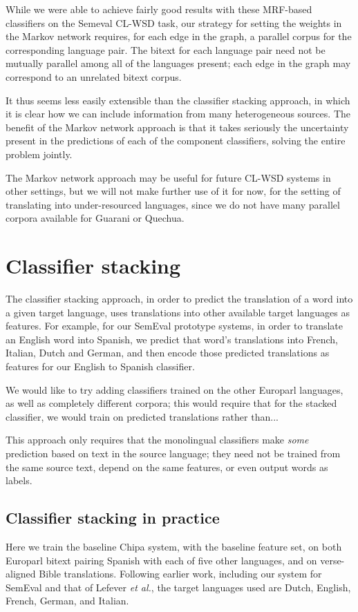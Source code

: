 While we were able to achieve fairly good results with these MRF-based
classifiers on the Semeval CL-WSD task, our strategy for setting the weights in
the Markov network requires, for each edge in the graph, a parallel corpus for
the corresponding language pair. The bitext for each language pair need not be
mutually parallel among all of the languages present; each edge in the graph
may correspond to an unrelated bitext corpus.

It thus seems less easily extensible than the classifier stacking approach, in
which it is clear how we can include information from many heterogeneous
sources. The benefit of the Markov network approach is that it takes seriously
the uncertainty present in the predictions of each of the component
classifiers, solving the entire problem jointly.

The Markov network approach may be useful for future CL-WSD systems in other
settings, but we will not make further use of it for now, for the setting of
translating into under-resourced languages, since we do not have many parallel
corpora available for Guarani or Quechua.

\section{Classifier stacking}
The classifier stacking approach, in order to predict the translation of a word
into a given target language, uses translations into other available target
languages as features.
For example, for our SemEval prototype systems, in order to translate an
English word into Spanish, we predict that word's translations into French,
Italian, Dutch and German, and then encode those predicted translations as
features for our English to Spanish classifier.


We would like to try adding classifiers trained on the other Europarl
languages, as well as completely different corpora; this would require that for
the stacked classifier, we would train on predicted translations rather than...

This approach only requires that the monolingual classifiers make \emph{some}
prediction based on text in the source language; they need not be trained from
the same source text, depend on the same features, or even output words as
labels.

\subsection{Classifier stacking in practice}
Here we train the baseline Chipa system, with the baseline feature set, on both
Europarl bitext pairing Spanish with each of five other languages, and on
verse-aligned Bible translations. Following
earlier work, including our system for SemEval and that of Lefever \emph{et
al.}, the target languages used are Dutch, English, French, German, and
Italian.


